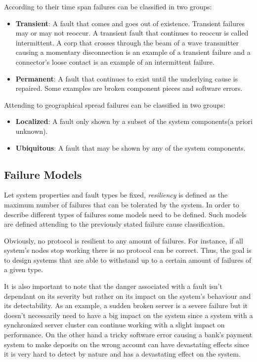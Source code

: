 \documentclass[..]{subfiles}
\begin{document}
According to their time span failures can be classified in two groups:
\begin{itemize}
	\item \textbf{Transient}: A fault that comes and goes out of existence. Transient failures may or may not reoccur. A transient fault that continues to reoccur is called intermittent. A corp that crosses through the beam of a wave transmitter causing a momentary disconnection is an example of a transient failure and a connector's loose contact is an example of an intermittent failure.
	\item \textbf{Permanent}: A fault that continues to exist until the underlying cause is repaired. Some examples are broken component pieces and software errors.
\end{itemize}

Attending to geographical spread failures can be classified in two groups:
\begin{itemize}
	\item \textbf{Localized}: A fault only shown by a subset of the system components(a priori unknown).
	\item \textbf{Ubiquitous}: A fault that may be shown by any of the system components.
\end{itemize}



\subsection{Failure Models}

Let system properties and fault types be fixed, \textit{resiliency} is defined as the maximum number of failures that can be tolerated by the system. In order to describe different types of failures some models need to be defined. Such models are defined attending to the previously stated failure cause classification. 

Obviously, no protocol is resilient to any amount of failures. For instance, if all system's nodes stop working there is no protocol can be correct. Thus, the goal is to design systems that are able to withstand up to a certain amount of failures of a given type.

It is also important to note that the danger associated with a fault isn't dependant on its severity but rather on its impact on the system's behaviour and its detectability. As an example, a sudden broken server is a severe failure but it doesn't necessarily need to have a big impact on the system since a system with a synchronized server cluster can continue working with a slight impact on performance. On the other hand a tricky software error causing a bank's payment system to make deposits on the wrong account can have devastating effects since it is very hard to detect by nature and has a devastating effect on the system.
\end{document}
